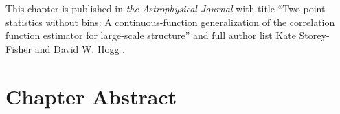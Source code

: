 This chapter is published in \emph{the Astrophysical Journal} with title ``Two-point statistics without bins: A continuous-function generalization of the correlation function estimator for large-scale structure'' and full author list Kate Storey-Fisher and David W. Hogg \citep{storey-fisher_two-point_2021}.






\graphicspath{{figures/figures_cfe/}}









\section{Chapter Abstract}

